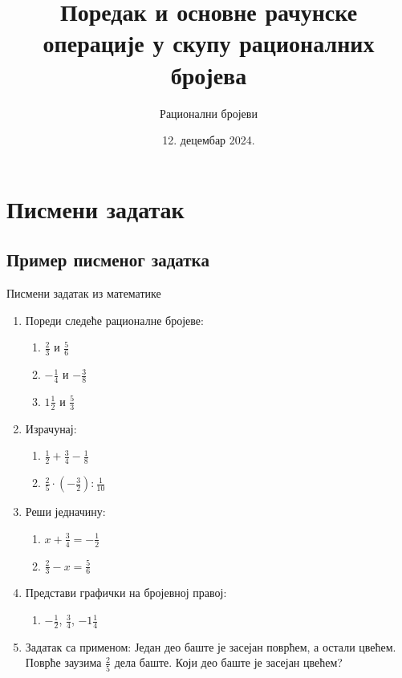 \documentclass[11pt]{beamer}
\author{Рационални бројеви}
\title{Поредак и основне рачунске операције у скупу рационалних бројева}
\institute{ОШ „Иван Горан Ковачић“, Станишић}
\date{12. децембар 2024.}
\begin{document}
\begin{frame}
\titlepage
\end{frame}

\begin{frame}
\tableofcontents
\end{frame}

\section{Писмени задатак}

\subsection{Пример писменог задатка}
\begin{frame}{Писмени задатак из математике}
    \begin{enumerate}
        \item Пореди следеће рационалне бројеве:
            \begin{enumerate}
                \item $\frac{2}{3}$ и $\frac{5}{6}$
                \item $-\frac{1}{4}$ и $-\frac{3}{8}$
                \item $1\frac{1}{2}$ и $\frac{5}{3}$
            \end{enumerate}
        \item Израчунај:
            \begin{enumerate}
                \item $\frac{1}{2} + \frac{3}{4} - \frac{1}{8}$
                \item $\frac{2}{5} \cdot \left(-\frac{3}{2}\right) : \frac{1}{10}$
            \end{enumerate}
        \item Реши једначину:
            \begin{enumerate}
                \item $x + \frac{3}{4} = -\frac{1}{2}$
                \item $\frac{2}{3} - x = \frac{5}{6}$
            \end{enumerate}
        \item Представи графички на бројевној правој:
            \begin{enumerate}
                \item $-\frac{1}{2}$, $\frac{3}{4}$, $-1\frac{1}{4}$
            \end{enumerate}
        \item Задатак са применом: 
            Један део баште је засејан поврћем, а остали цвећем. Поврће заузима $\frac{2}{5}$ дела баште. Који део баште је засејан цвећем?
    \end{enumerate}
\end{frame}
\end{document}
